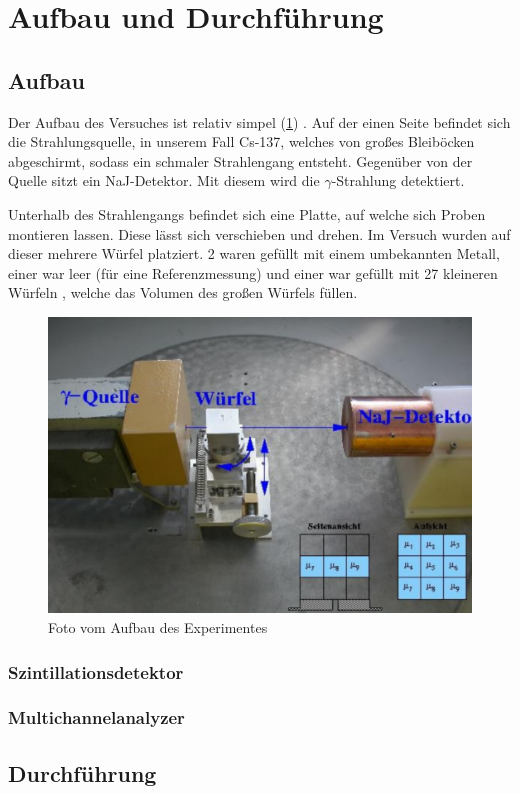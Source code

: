 \section{Aufbau und Durchführung}
\subsection{Aufbau}
Der Aufbau des Versuches ist relativ simpel (\ref{fig:1}) . Auf der einen Seite befindet sich die Strahlungsquelle, in unserem
Fall Cs-137, welches von großes Bleiböcken abgeschirmt, sodass ein schmaler Strahlengang entsteht. Gegenüber 
von der Quelle sitzt ein NaJ-Detektor. Mit diesem wird die $\gamma$-Strahlung detektiert. 

\noindent
Unterhalb des Strahlengangs befindet sich eine Platte, auf welche sich Proben montieren lassen. Diese lässt 
sich verschieben und drehen. Im Versuch wurden auf dieser mehrere Würfel platziert. 2 waren gefüllt mit einem
umbekannten Metall, einer war leer (für eine Referenzmessung) und einer war gefüllt mit 27 kleineren Würfeln
, welche das Volumen des großen Würfels füllen.

\begin{figure}[H]
	\centering
	\includegraphics{aufbau.png}
	\caption{Foto vom Aufbau des Experimentes \biber}
	\label{fig:1}
\end{figure}

\subsubsection{Szintillationsdetektor}


\subsubsection{Multichannelanalyzer}



\subsection{Durchführung}




